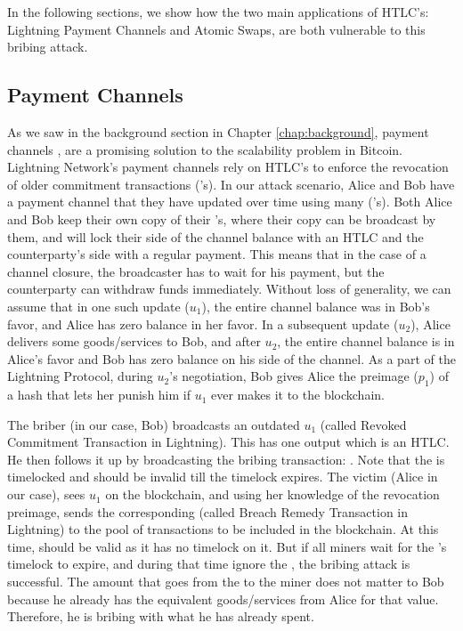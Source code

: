 In the following sections, we show how the two main applications of HTLC's: Lightning Payment Channels and Atomic Swaps, are both vulnerable to this bribing attack.

\subsection{Payment Channels}
As we saw in the background section in Chapter \ref{chap:background}, payment channels \cite{decker_wattenhofer}, \cite{poon_dryja} are a promising solution to the scalability problem in Bitcoin. Lightning Network's \cite{poon_dryja} payment channels rely on HTLC's to enforce the revocation of older commitment transactions (\ctx{}'s). In our attack scenario, Alice and Bob have a payment channel that they have updated over time using many (\ctx{}'s). Both Alice and Bob keep their own copy of their \ctx{}'s, where their copy can be broadcast by them, and will lock their side of the channel balance with an HTLC and the counterparty's side with a regular payment. This means that in the case of a channel closure, the broadcaster has to wait for his payment, but the counterparty can withdraw funds immediately. Without loss of generality, we can assume that in one such update ($u_1$), the entire channel balance was in Bob's favor, and Alice has zero balance in her favor. In a subsequent update ($u_2$), Alice delivers some goods/services to Bob, and after $u_2$, the entire channel balance is in Alice's favor and Bob has zero balance on his side of the channel. As a part of the Lightning Protocol, during $u_2$'s negotiation, Bob gives Alice the preimage ($p_1$) of a hash that lets her punish him if $u_1$ ever makes it to the blockchain. 

The briber (in our case, Bob) broadcasts an outdated \ctx{} $u_1$ (called Revoked Commitment Transaction in Lightning). This has one output which is an HTLC. He then follows it up by broadcasting the bribing transaction: \bribetxn. Note that the \bribetxn{} is timelocked and should be invalid till the timelock expires. The victim (Alice in our case), sees $u_1$ on the blockchain, and using her knowledge of the revocation preimage, sends the corresponding \sellertxn{} (called Breach Remedy Transaction in Lightning) to the pool of transactions to be included in the blockchain. At this time, \sellertxn{} should be valid as it has no timelock on it. But if all miners wait for the \bribetxn{}'s timelock to expire, and during that time ignore the \sellertxn{}, the bribing attack is successful. The amount that goes from the \bribetxn{} to the miner does not matter to Bob because he already has the equivalent goods/services from Alice for that value. Therefore, he is bribing with what he has already spent.

